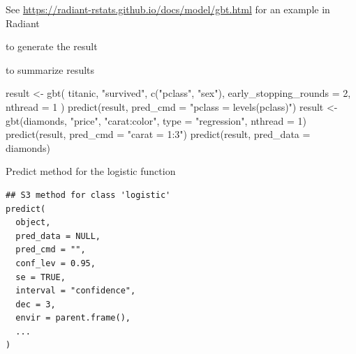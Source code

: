 \documentclass[a4paper]{book}
\begin{document}
%
\begin{Details}
See \url{https://radiant-rstats.github.io/docs/model/gbt.html} for an example in Radiant
\end{Details}
%
\begin{SeeAlso}
 to generate the result

 to summarize results
\end{SeeAlso}
%
\begin{Examples}
\begin{ExampleCode}
result <- gbt(
  titanic, "survived", c("pclass", "sex"),
  early_stopping_rounds = 2, nthread = 1
)
predict(result, pred_cmd = "pclass = levels(pclass)")
result <- gbt(diamonds, "price", "carat:color", type = "regression", nthread = 1)
predict(result, pred_cmd = "carat = 1:3")
predict(result, pred_data = diamonds) %
\end{ExampleCode}
\end{Examples}
%
\begin{Description}
Predict method for the logistic function
\end{Description}
%
\begin{Usage}
\begin{verbatim}
## S3 method for class 'logistic'
predict(
  object,
  pred_data = NULL,
  pred_cmd = "",
  conf_lev = 0.95,
  se = TRUE,
  interval = "confidence",
  dec = 3,
  envir = parent.frame(),
  ...
)
\end{verbatim}
\end{Usage}
%
\end{document}
